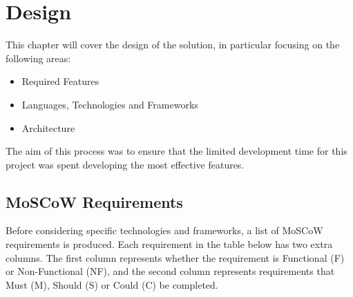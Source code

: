 \chapter{Design}\label{cha:design}
This chapter will cover the design of the solution, in particular focusing on the following areas:

\begin{itemize}
	\item Required Features
	\item Languages, Technologies and Frameworks
	\item Architecture
\end{itemize}

The aim of this process was to ensure that the limited development time for this project was spent developing the most effective features.

\section{MoSCoW Requirements}

Before considering specific technologies and frameworks, a list of MoSCoW requirements is produced. Each requirement in the table below has two extra columns. The first column represents whether the requirement is Functional (F) or Non-Functional (NF), and the second column represents requirements that Must (M), Should (S) or Could (C) be completed.

